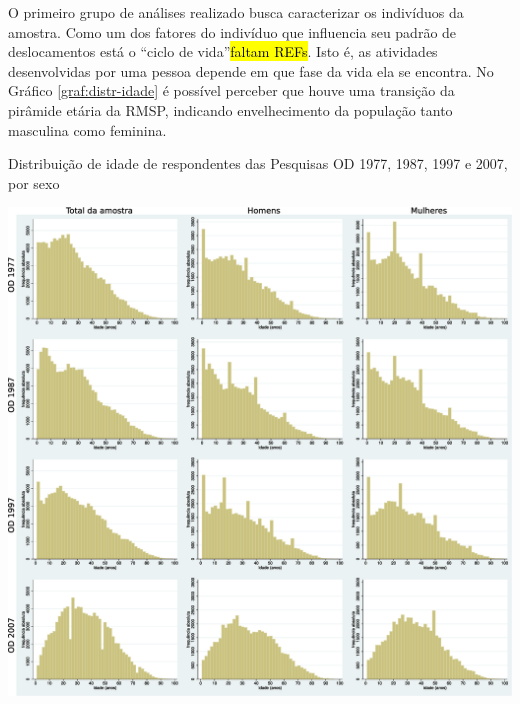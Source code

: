 O primeiro grupo de análises realizado busca caracterizar os indivíduos da amostra. Como um dos fatores do indivíduo que influencia seu padrão de deslocamentos está o ``ciclo de vida''\hl{faltam REFs}. Isto é, as atividades desenvolvidas por uma pessoa depende em que fase da vida ela se encontra. No Gráfico \ref{graf:distr-idade} é possível perceber que houve uma transição da pirâmide etária da RMSP, indicando envelhecimento da população tanto masculina como feminina.

\begin{grafico}[htb]%
    \caption{\label{graf:distr-idade}Distribuição de idade de respondentes das Pesquisas OD 1977, 1987, 1997 e 2007, por sexo}%
    \begin{center}%
        \includegraphics[width=1\textwidth]{./imagens/idade2.eps}%
    \end{center}%
\end{grafico}%

